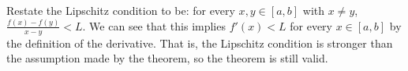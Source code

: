 Restate the Lipschitz condition to be: for every $x,y \in [a,b]$ with $x
\not= y$, $\frac{f(x)-f(y)}{x-y} < L$.  We can see that this implies
$f'(x) < L$ for every $x \in [a,b]$ by the definition of the derivative.
That is, the Lipschitz condition is stronger than the assumption made by
the theorem, so the theorem is still valid.
